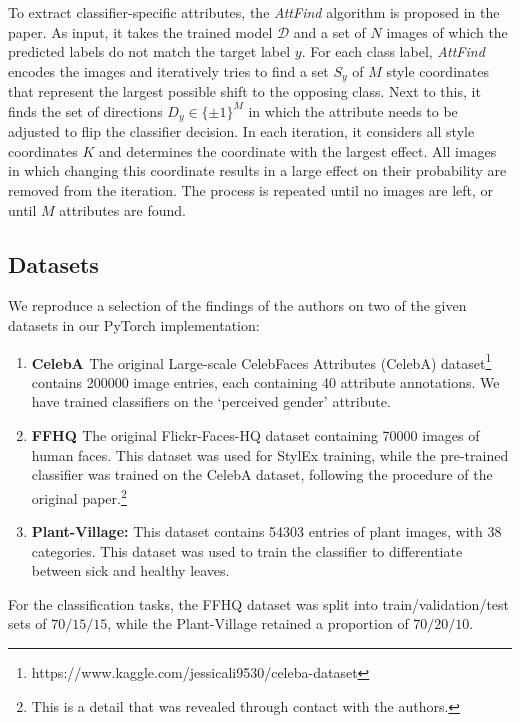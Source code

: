 To extract classifier-specific attributes, the \textit{AttFind} algorithm is proposed in the paper. As input, it takes the trained model $\mathcal{D}$ and a set of $N$ images of which the predicted labels do not match the target label $y$. For each class label, \textit{AttFind} encodes the images and iteratively tries to find a set $S_{y}$ of $M$ style coordinates that represent the largest possible shift to the opposing class. Next to this, it finds the set of directions $D_{y} \in \{\pm1\}^M$ in which the attribute needs to be adjusted to flip the classifier decision. In each iteration, it considers all style coordinates $K$ and determines the coordinate with the largest effect. All images in which changing this coordinate results in a large effect on their probability are removed from the iteration. The process is repeated until no images are left, or until $M$ attributes are found.


\subsection{Datasets}

We reproduce a selection of the findings of the authors on two of the given datasets in our PyTorch implementation:

\begin{enumerate}
    \item \textbf{CelebA \cite{liu2015faceattributes}}  The original Large-scale CelebFaces Attributes (CelebA) dataset\footnote{https://www.kaggle.com/jessicali9530/celeba-dataset} contains 200000 image entries, each containing 40 attribute annotations. We have trained classifiers on the `perceived gender' attribute.
    \item \textbf{FFHQ  \cite{orel2020lifespan}} The original Flickr-Faces-HQ dataset containing 70000 images of human faces. This dataset was used for StylEx training, while the pre-trained classifier was trained on the CelebA dataset, following the procedure of the original paper.\footnote{This is a detail that was revealed through contact with the authors.}
    \item \textbf{Plant-Village:} This dataset contains 54303 entries of plant images, with 38 categories. This dataset was used to train the classifier to differentiate between sick and healthy leaves.
\end{enumerate}


For the classification tasks, the FFHQ dataset was split into train/validation/test sets of $70/15/15$, while the Plant-Village retained a proportion of $70/20/10$.

